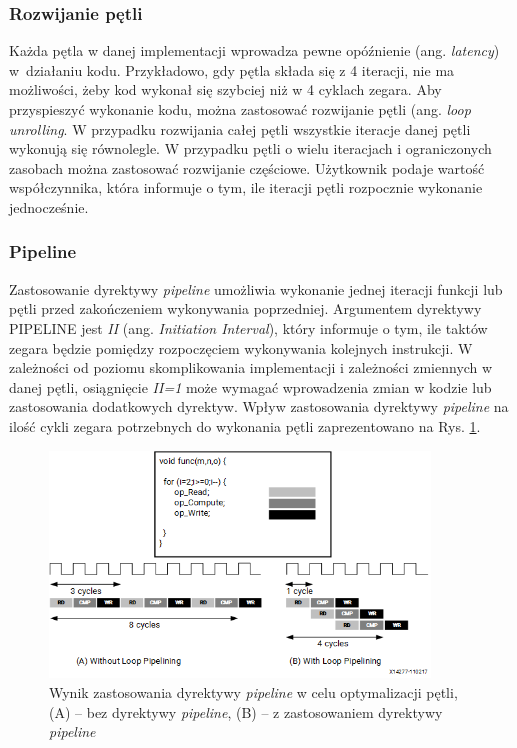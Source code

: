 \subsubsection{Rozwijanie pętli}

Każda pętla w danej implementacji wprowadza pewne opóźnienie (ang. \emph{latency}) w~działaniu kodu. Przykładowo, gdy pętla składa się z 4 iteracji, nie ma możliwości, żeby kod wykonał się szybciej niż w 4 cyklach zegara. Aby przyspieszyć wykonanie kodu, można zastosować rozwijanie pętli (ang. \emph{loop unrolling}. W przypadku rozwijania całej pętli wszystkie iteracje danej pętli wykonują się równolegle. W przypadku pętli o wielu iteracjach i ograniczonych zasobach można zastosować rozwijanie częściowe. Użytkownik podaje wartość współczynnika, która informuje o tym, ile iteracji pętli rozpocznie wykonanie jednocześnie.

\subsubsection{Pipeline}
Zastosowanie dyrektywy \emph{pipeline} umożliwia wykonanie jednej iteracji funkcji lub pętli przed zakończeniem wykonywania poprzedniej. Argumentem dyrektywy PIPELINE jest \emph{II} (ang. \emph{Initiation Interval}), który informuje o tym, ile taktów zegara będzie pomiędzy rozpoczęciem wykonywania kolejnych instrukcji. W zależności od poziomu skomplikowania implementacji i zależności zmiennych w danej pętli, osiągnięcie \emph{II=1} może wymagać wprowadzenia zmian w kodzie lub zastosowania dodatkowych dyrektyw. Wpływ zastosowania dyrektywy \emph{pipeline} na ilość cykli zegara potrzebnych do wykonania pętli zaprezentowano na Rys. \ref{pipeline}.

\begin{figure}[!h]
  \centering
  \includegraphics[width=0.9\textwidth]{img/pipeline.png}
  \caption{Wynik zastosowania dyrektywy \emph{pipeline} w celu optymalizacji pętli, (A) -- bez dyrektywy \emph{pipeline},  (B) -- z zastosowaniem dyrektywy \emph{pipeline} \cite{pipeline}}
  \label{pipeline}
\end{figure}

